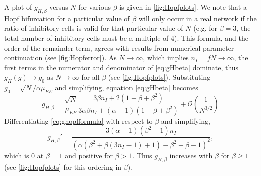 \documentclass[11pt,reqno]{amsart}
\begin{document}
A plot of $g_{H,\beta}$ versus $N$ for various $\beta$ is given in \cref{fig:Hopfplots}. We note that a Hopf bifurcation for a particular value of $\beta$ will only occur in a real network if the ratio of inhibitory cells is valid for that particular value of $N$ (e.g. for $\beta = 3$, the total number of inhibitory cells must be a multiple of 4). This formula, and the order of the remainder term, agrees with results from numerical parameter continuation (see \cref{fig:Hopferror}). As $N \rightarrow \infty$, which implies $n_I = f N \rightarrow \infty$, the first terms in the numerator and denominator of \cref{eq:gHbeta} dominate, thus $g_H(g) \rightarrow g_0$ as $N \rightarrow \infty$ for all $\beta$ (see \cref{fig:Hopfplots}). Substituting $g_0 = \sqrt{N}/\alpha \mu_{EE}$ and simplifying, equation \cref{eq:gHbeta} becomes
\begin{equation}\label{eq:ghopfformula}
g_{H,\beta} = 
\frac{\sqrt{N}}{\mu_{EE}} 
\frac{ 3 \beta n_I  + 2(1 - \beta + \beta^2 ) }
{ 3 \alpha \beta n_I + (\alpha - 1)(1 - \beta + \beta^2 ) }
+ \mathcal{O}\left( \frac{1}{N^{3/2}} \right)
\end{equation}
Differentiating \cref{eq:ghopfformula} with respect to $\beta$ and simplifying,
\begin{equation}\label{eq:gprime}
g_{H,\beta}' = 
    \frac{ 
    3 (\alpha+1) \left(\beta^2-1\right) n_I
    }
    {
    \left(\alpha \left(\beta^2+\beta (3 n_I -1)+1\right)-\beta^2+\beta-1\right)^2},
\end{equation}
which is 0 at $\beta = 1$ and positive for $\beta > 1$. Thus $g_{H,\beta}$ increases with $\beta$ for $\beta \geq 1$ (see \cref{fig:Hopfplots} for this ordering in $\beta$). 
\end{document}
